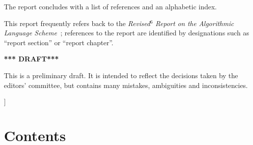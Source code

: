 \documentclass[twoside,twocolumn]{algol60}
\begin{document}
{The report concludes with a list of references and an
alphabetic index.

This report frequently refers back to the \textit{Revised$^6$ Report
  on the Algorithmic Language Scheme}~\cite{R6RS}; references to the
report are identified by designations such as ``report section'' or
``report chapter''.

\bigskip

\begin{center}
{\large \bf
*** DRAFT*** \\
}\end{center}

This is a preliminary draft.  It is intended to reflect the decisions
taken by the editors' committee, but contains many mistakes,
ambiguities and inconsistencies.

}]

\texonly\clearpage\endtexonly

\chapter*{Contents}
\addvspace{3.5pt}                  %
\renewcommand{\tocshrink}{-4.0pt}  %
{%
\tableofcontents
}

\vfill

\texonly\clearpage\endtexonly

 \par
 \par
    \par
    \par
 \par
 \par
     \par
      \par
   \par
 \par
   \par
 \par
 \par
    \par
 \par
    \par
  \par
 \par
 \par
 \par
\renewcommand{\bibname}{References}




\vfill\eject


\newcommand{\indexheading}{Alphabetic index of definitions of
  concepts, keywords, and procedures}
\newcommand{\indexintro}{}

\printindex
\end{document}
